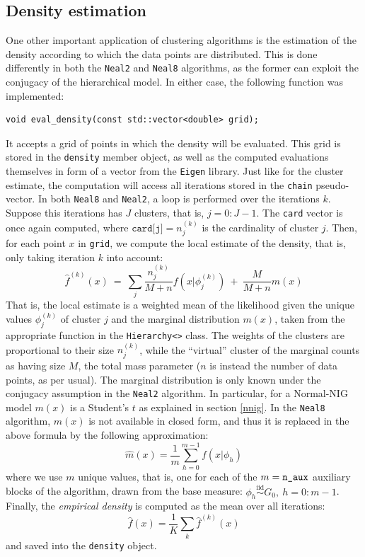 \subsection{Density estimation}
One other important application of clustering algorithms is the estimation of the density according to which the data points are distributed.
This is done differently in both the \verb|Neal2| and \verb|Neal8| algorithms, as the former can exploit the conjugacy of the hierarchical model.
In either case, the following function was implemented:
\begin{verbatim}
void eval_density(const std::vector<double> grid);
\end{verbatim}
It accepts a grid of points in which the density will be evaluated.
This grid is stored in the \verb|density| member object, as well as the computed evaluations themselves in form of a vector from the \verb|Eigen| library.
Just like for the cluster estimate, the computation will access all iterations stored in the \verb|chain| pseudo-vector.
In both \verb|Neal8| and \verb|Neal2|, a loop is performed over the iterations $k$.
Suppose this iterations has $J$ clusters, that is, $j=0:J-1$.
The \verb|card| vector is once again computed, where $\texttt{card[j]} = n^{(k)}_j$ is the cardinality of cluster $j$.
Then, for each point $x$ in \verb|grid|, we compute the local estimate of the density, that is, only taking iteration $k$ into account:
$$
\hat f^{(k)}(x) \ = \ \sum_j \frac{n^{(k)}_j}{M+n} f\left(x | \phi^{(k)}_j\right) \ + \ \frac{M}{M+n} m(x)
$$
That is, the local estimate is a weighted mean of the likelihood given the unique values $\phi^{(k)}_j$ of cluster $j$ and the marginal distribution $m(x)$, taken from the appropriate function in the \verb|Hierarchy<>| class.
The weights of the clusters are proportional to their size $n^{(k)}_j$, while the ``virtual'' cluster of the marginal counts as having size $M$, the total mass parameter ($n$ is instead the number of data points, as per usual).
The marginal distribution is only known under the conjugacy assumption in the \verb|Neal2| algorithm.
In particular, for a Normal-NIG model $m(x)$ is a Student's $t$ as explained in section \ref{nnig}.
In the \verb|Neal8| algorithm, $m(x)$ is not available in closed form, and thus it is replaced in the above formula by the following approximation:
$$
\hat m(x) = \frac{1}{m} \sum_{h=0}^{m-1}  f\left(x | \phi_h\right)
$$
where we use $m$ unique values, that is, one for each of the $m = \verb|n_aux|$ auxiliary blocks of the algorithm, drawn from the base measure: $\phi_{h} \overset{\text{iid}}{\sim} G_0, \ h=0:m-1$. \\
Finally, the \emph{empirical density} is computed as the mean over all iterations:
$$
\hat f(x) = \frac{1}{K} \sum_k \hat f^{(k)}(x)
$$
and saved into the \verb|density| object.

